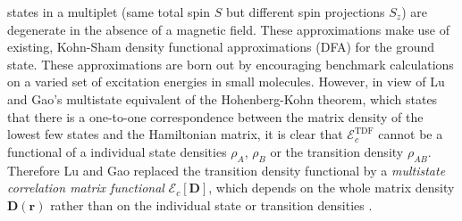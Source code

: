 \documentclass[journal=jacsat,manuscript=article]{achemso}
\newcommand\m[1]{\mathbf{#1}}
\renewcommand\vec[1]{\mathbf{#1}}
\begin{document}
states in a multiplet (same total spin $S$ but different spin projections $S_z$) are degenerate in the absence of a magnetic field.
These approximations make use of existing, Kohn-Sham density functional approximations (DFA)
for the ground state. These approximations are born out by encouraging benchmark calculations \cite{Zhu2023} on a varied set
of excitation energies in small molecules. However, in view of Lu and Gao's multistate equivalent of the Hohenberg-Kohn theorem,
which states that there is a one-to-one correspondence between the matrix density of the lowest few states and the Hamiltonian matrix,
it is clear that $\mathcal{E}^{\text{TDF}}_c$ cannot be a functional of a individual state densities $\rho_A$, $\rho_B$
or the transition density $\rho_{AB}$. Therefore Lu and Gao
replaced the transition density functional by a \emph{multistate correlation matrix functional} $\mathcal{E}_{c}[\m{D}]$, which depends
on the whole matrix density $\m{D}(\vec{r})$ rather than on the individual state or transition densities \cite{Lu2022fundamental}.
\end{document}
